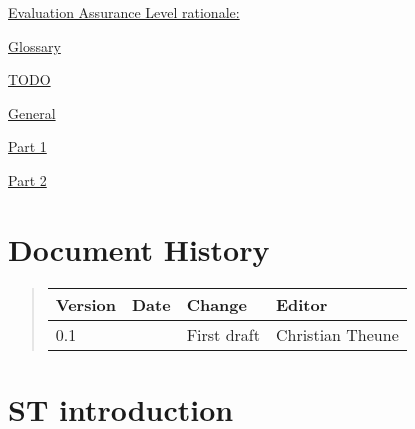 \documentclass[10pt,a4paper,english]{article}
\newlength{\locallinewidth}
\begin{document}
\begin{list}{}{}
\begin{list}{}{}
\item {} \href{\#evaluation-assurance-level-rationale}{Evaluation Assurance Level rationale:}

\end{list}

\item {} \href{\#glossary}{Glossary}

\item {} \href{\#todo}{TODO}
\begin{list}{}{}
\item {} \href{\#general}{General}

\item {} \href{\#part-1}{Part 1}

\item {} \href{\#part-2}{Part 2}

\end{list}

\end{list}




\hypertarget{document-history}{}
\section*{Document History}
\begin{quote}

\begin{longtable}[c]{|p{0.11\locallinewidth}|p{0.11\locallinewidth}|p{0.23\locallinewidth}|p{0.20\locallinewidth}|}
\hline
\textbf{
Version
} & \textbf{
Date
} & \textbf{
Change
} & \textbf{
Editor
} \\
\hline
\endhead

0.1
 &  & 
First draft
 & 
Christian Theune
 \\
\hline
\end{longtable}
\end{quote}



\hypertarget{st-introduction}{}
\section*{ST introduction}


\end{document}
